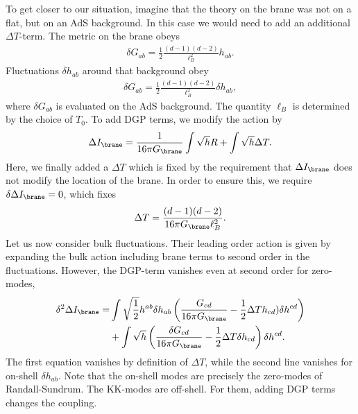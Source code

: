 To get closer to our situation, imagine that the theory on the brane was not on a flat, but on an AdS background. In this case we would need to add an additional $\Delta T$-term. The metric on the brane obeys
\begin{align}
\delta G_{ab} = \frac 1 2 \frac{(d-1)(d-2)}{\ell_B^2} h_{ab}.
\end{align}
Fluctuations $\delta h_{ab}$ around that background obey
\begin{align}
\delta G_{ab} = \frac 1 2 \frac{(d-1)(d-2)}{\ell_B^2} \delta h_{ab},
\end{align}
where $\delta G_{ab}$ is evaluated on the AdS background. The quantity $\ell_B$ is determined by the choice of $T_0$. To add DGP terms, we modify the action by
\begin{align}
\Delta I_\brane = \frac 1 {16 \pi G_\brane} \int \sqrt h R + \int \sqrt h \Delta T.
\end{align}
Here, we finally added a $\Delta T$ which is fixed by the requirement that $\Delta I_\brane$ does not modify the location of the brane. In order to ensure this, we require $\delta \Delta I_\brane = 0$, which fixes
\begin{align}
\Delta T = \frac{(d-1)(d-2)}{16 \pi G_\brane \ell_B^2}.
\end{align}
Let us now consider bulk fluctuations. Their leading order action is given by expanding the bulk action including brane terms to second order in the fluctuations. However, the DGP-term vanishes even at second order for zero-modes,
\begin{align}
\delta^2 \Delta I_\brane =& \int \sqrt \frac 1 2 h^{ab} \delta h_{ab} \left( \frac{G_{cd}}{16 \pi G_\brane} - \frac 1 2 \Delta T h_{cd}) \delta h^{cd} \right) \\
&+ \int \sqrt{h} \left( \frac{\delta G_{cd}}{16 \pi G_\brane} - \frac 1 2 \Delta T \delta h_{cd}\right) \delta h^{cd}.
\end{align}
The first equation vanishes by definition of $\Delta T$, while the second line vanishes for on-shell $\delta h_{ab}$. Note that the on-shell modes are precisely the zero-modes of Randall-Sundrum. The KK-modes are off-shell. For them, adding DGP terms changes the coupling.


